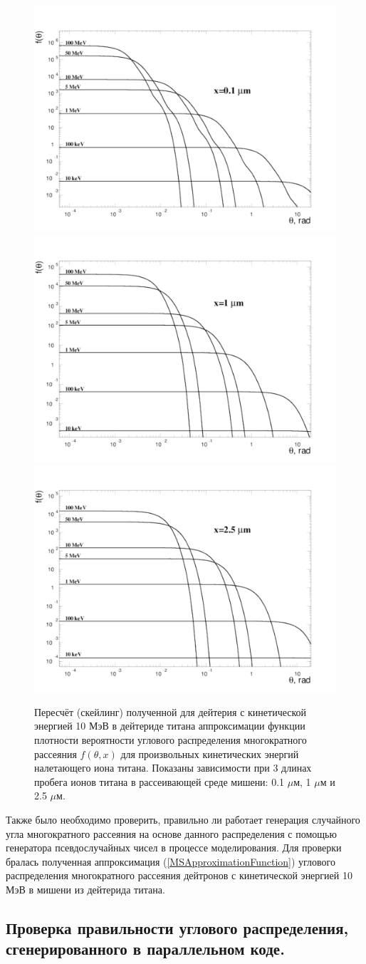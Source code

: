 \documentclass[a4paper,12pt]{article}
\begin{document}
\begin{large}
\begin{figure}[ht]
{
   \includegraphics[width=0.32\linewidth]{images/funtheta_0_1mkm_ti.pdf}
   \includegraphics[width=0.32\linewidth]{images/funtheta_1mkm_ti.pdf}
   \includegraphics[width=0.32\linewidth]{images/funtheta_2_5mkm_ti.pdf}
}
\caption{Пересчёт (скейлинг) полученной для дейтерия с кинетической энергией 10 МэВ в дейтериде титана аппроксимации функции плотности вероятности углового распределения многократного рассеяния $f(\theta,x)$ для произвольных кинетических энергий налетающего иона титана.
	Показаны зависимости при 3 длинах пробега ионов титана в рассеивающей среде мишени: 0.1 $\mu$м, 1 $\mu$м и 2.5 $\mu$м.}
\label{fig:MFthetaScalingTitan}
\end{figure}

	Также было необходимо проверить, правильно ли работает генерация случайного угла многократного рассеяния на основе данного распределения с помощью генератора псевдослучайных чисел в процессе моделирования.
	Для проверки бралась полученная аппроксимация (\ref{MSApproximationFunction}) углового распределения многократного рассеяния дейтронов с кинетической энергией 10 МэВ в мишени из дейтерида титана.
	
\subsection{Проверка правильности углового распределения, сгенерированного в параллельном коде.}
\label{subValMS3}


\end{large}
\end{document}
